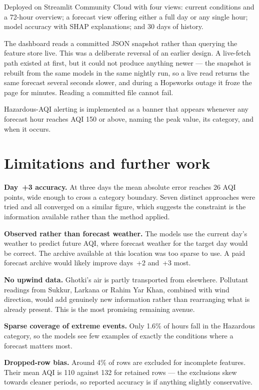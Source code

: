 \documentclass[11pt,a4paper]{article}
\begin{document}
Deployed on Streamlit Community Cloud with four views: current
conditions and a 72-hour overview; a forecast view offering either a
full day or any single hour; model accuracy with SHAP explanations; and
30 days of history.

The dashboard reads a committed JSON snapshot rather than querying the
feature store live. This was a deliberate reversal of an earlier design.
A live-fetch path existed at first, but it could not produce anything
newer --- the snapshot is rebuilt from the same models in the same
nightly run, so a live read returns the same forecast several seconds
slower, and during a Hopsworks outage it froze the page for minutes.
Reading a committed file cannot fail.

Hazardous-AQI alerting is implemented as a banner that appears whenever
any forecast hour reaches AQI 150 or above, naming the peak value, its
category, and when it occurs.

\section{Limitations and further work}

\textbf{Day~+3 accuracy.} At three days the mean absolute error reaches
26 AQI points, wide enough to cross a category boundary. Seven distinct
approaches were tried and all converged on a similar figure, which
suggests the constraint is the information available rather than the
method applied.

\textbf{Observed rather than forecast weather.} The models use the
current day's weather to predict future AQI, where forecast weather for
the target day would be correct. The archive available at this location
was too sparse to use. A paid forecast archive would likely improve
days~+2 and~+3 most.

\textbf{No upwind data.} Ghotki's air is partly transported from
elsewhere. Pollutant readings from Sukkur, Larkana or Rahim Yar Khan,
combined with wind direction, would add genuinely new information rather
than rearranging what is already present. This is the most promising
remaining avenue.

\textbf{Sparse coverage of extreme events.} Only 1.6\% of hours fall in
the Hazardous category, so the models see few examples of exactly the
conditions where a forecast matters most.

\textbf{Dropped-row bias.} Around 4\% of rows are excluded for
incomplete features. Their mean AQI is 110 against 132 for retained rows
--- the exclusions skew towards cleaner periods, so reported accuracy is
if anything slightly conservative.
\end{document}
